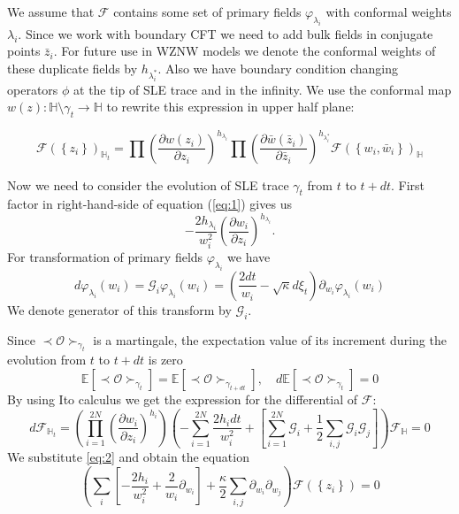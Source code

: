 \documentclass[a4paper]{jpconf}
\theoremstyle{definition}
\theoremstyle{definition} \newtheorem{Def}{Definition}
\begin{document}
We assume that $\mathcal{F}$ contains some set of primary fields $\varphi_{\lambda_{i}}$ with conformal weights $\lambda_{i}$. Since we work with boundary CFT we need to add bulk fields in conjugate points $\bar z_{i}$. For future use in WZNW models we denote the conformal weights of these duplicate fields by $h_{\lambda_{i}^{*}}$.  Also we have boundary condition changing operators  $\phi$ at the tip of SLE trace and in the infinity.  We use the conformal map  $w(z):\mathbb{H}\setminus\gamma_{t}\to \mathbb{H}$ to rewrite this expression in upper half plane:

\begin{equation}
  \mathcal{F}(\left\{z_{i}\right\})_{\mathbb{H}_{t}}=\prod \left(\frac{\partial w(z_{i})}{\partial z_{i}}\right)^{h_{\lambda_i}} 
  \prod \left(\frac{\partial \bar w(\bar z_{i})}{\partial \bar z_{i}}\right)^{h_{\lambda^{*}_i}}
  \mathcal{F}(\left\{w_{i}, \bar w_{i}\right\})_{\mathbb{H}}
  \label{eq:1}
\end{equation}

Now we need to consider the evolution of SLE trace $\gamma_{t}$ from  $t$ to $t+ dt$. First factor in right-hand-side of equation (\ref{eq:1}) gives us
\begin{equation*}
  -\frac{2h_{\lambda_{i}}}{w_{i}^{2}}\left(\frac{\partial w_{i}}{\partial z_{i}}\right)^{h_{\lambda_{i}}}.
\end{equation*}
For transformation of primary fields $\varphi_{\lambda_{i}}$ we have 
\begin{equation}
  \label{eq:2}
  d\varphi_{\lambda_{i}}(w_{i}) = \mathcal{G}_{i}\varphi_{\lambda_{i}}(w_{i})=\left(\frac{2dt}{w_{i}}-\sqrt{\kappa} d\xi_{t}\right) \partial_{w_{i}}\varphi_{\lambda_{i}}(w_{i}) 
\end{equation}
We denote generator of this transform by $\mathcal{G}_{i}$.

Since $ \prec\mathcal{O}\succ_{\gamma_{t}}$ is a martingale, the expectation value of its increment during the evolution from $t$ to $t+dt$ is zero
\begin{equation}
  \mathbb{E}\left[\prec\mathcal{O}\succ_{\gamma_{t}}\right]=    \mathbb{E}\left[\prec\mathcal{O}\succ_{\gamma_{t+dt}}\right], \quad d\mathbb{E}\left[ \prec\mathcal{O}\succ_{\gamma_{t}}\right]=0
\label{eq:22}
\end{equation}
By using Ito calculus we get the expression for the differential of $\mathcal{F}$:
\begin{equation}
d \mathcal{F}_{\mathbb{H}_{t}}= \left(\prod_{i=1}^{2N}\left(\frac{\partial w_{i}}{\partial z_{i}}\right)^{h_{i}}\right)\left(-\sum_{i=1}^{2N}\frac{2h_{i}dt}{w_{i}^{2}}+\left[\sum_{i=1}^{2N}\mathcal{G}_{i}+\frac{1}{2}
      \sum_{i,j}\mathcal{G}_{i}\mathcal{G}_{j}\right]\right)\mathcal{F}_{\mathbb{H}}=0
\label{eq:8}
\end{equation}
We substitute \eqref{eq:2} and obtain the equation
\begin{equation}
  \left( \sum_{i}\left[-\frac{2h_{i}}{w_{i}^{2}} +\frac{2}{w_{i}}\partial_{w_{i}}\right]+\frac{\kappa}{2}\sum_{i,j}\partial_{w_{i}} \partial_{w_{j}}\right)\mathcal{F}(\left\{z_{i}\right\})=0
\label{eq:23}
\end{equation}
\end{document}
